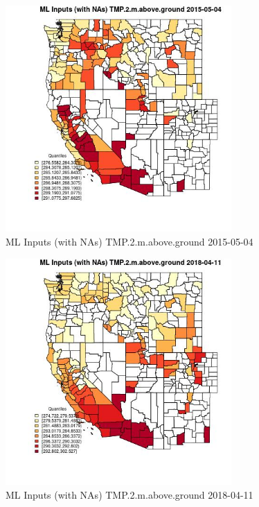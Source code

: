 \begin{figure} 
\centering  
\includegraphics[width=0.77\textwidth]{Code_Outputs/Report_ML_input_PM25_Step4_part_e_de_duplicated_aves_compiled_2019-05-18wNAs_CountyTMP2mabovegroundMean2015-05-04_2015-05-04.jpg} 
\caption{\label{fig:Report_ML_input_PM25_Step4_part_e_de_duplicated_aves_compiled_2019-05-18wNAsCountyTMP2mabovegroundMean2015-05-04_2015-05-04}ML Inputs (with NAs) TMP.2.m.above.ground 2015-05-04} 
\end{figure} 
 

\begin{figure} 
\centering  
\includegraphics[width=0.77\textwidth]{Code_Outputs/Report_ML_input_PM25_Step4_part_e_de_duplicated_aves_compiled_2019-05-18wNAs_CountyTMP2mabovegroundMean2018-04-11_2018-04-11.jpg} 
\caption{\label{fig:Report_ML_input_PM25_Step4_part_e_de_duplicated_aves_compiled_2019-05-18wNAsCountyTMP2mabovegroundMean2018-04-11_2018-04-11}ML Inputs (with NAs) TMP.2.m.above.ground 2018-04-11} 
\end{figure} 
 

